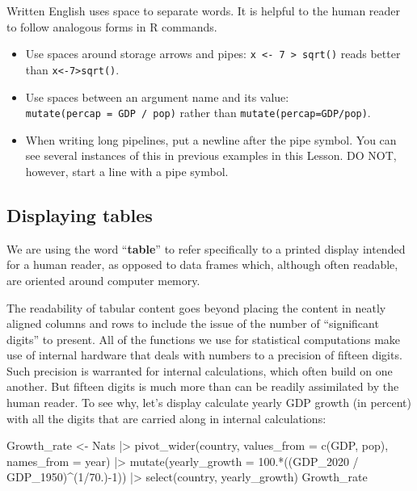 \documentclass[
  letterpaper,
  DIV=11,
  numbers=noendperiod,
  oneside]{scrartcl}
\newenvironment{Shaded}{\begin{snugshade}}{\end{snugshade}}
\newcommand{\AttributeTok}[1]{\textcolor[rgb]{0.40,0.45,0.13}{#1}}
\newcommand{\DecValTok}[1]{\textcolor[rgb]{0.68,0.00,0.00}{#1}}
\newcommand{\FloatTok}[1]{\textcolor[rgb]{0.68,0.00,0.00}{#1}}
\newcommand{\FunctionTok}[1]{\textcolor[rgb]{0.28,0.35,0.67}{#1}}
\newcommand{\NormalTok}[1]{\textcolor[rgb]{0.00,0.23,0.31}{#1}}
\newcommand{\OtherTok}[1]{\textcolor[rgb]{0.00,0.23,0.31}{#1}}
\newcommand{\SpecialCharTok}[1]{\textcolor[rgb]{0.37,0.37,0.37}{#1}}
\providecommand{\tightlist}{%
  \setlength{\itemsep}{0pt}\setlength{\parskip}{0pt}}\usepackage{longtable,booktabs,array}
\begin{document}
Written English uses space to separate words. It is helpful to the human
reader to follow analogous forms in R commands.

\begin{itemize}
\tightlist
\item
  Use spaces around storage arrows and pipes:
  \texttt{x\ \textless{}-\ 7\ \textbar{}\textgreater{}\ sqrt()} reads
  better than \texttt{x\textless{}-7\textbar{}\textgreater{}sqrt()}.
\item
  Use spaces between an argument name and its value:
  \texttt{mutate(percap\ =\ GDP\ /\ pop)} rather than
  \texttt{mutate(percap=GDP/pop)}.
\item
  When writing long pipelines, put a newline after the pipe symbol. You
  can see several instances of this in previous examples in this Lesson.
  DO NOT, however, start a line with a pipe symbol.
\end{itemize}

\subsection{Displaying tables}\label{sec-displaying-tables}

We are using the word ``\textbf{table}'' to refer specifically to a
printed display intended for a human reader, as opposed to data frames
which, although often readable, are oriented around computer memory.

The readability of tabular content goes beyond placing the content in
neatly aligned columns and rows to include the issue of the number of
``significant digits'' to present. All of the functions we use for
statistical computations make use of internal hardware that deals with
numbers to a precision of fifteen digits. Such precision is warranted
for internal calculations, which often build on one another. But fifteen
digits is much more than can be readily assimilated by the human reader.
To see why, let's display calculate yearly GDP growth (in percent) with
all the digits that are carried along in internal calculations:

\begin{Shaded}
\begin{Highlighting}[]
\NormalTok{Growth\_rate }\OtherTok{\textless{}{-}}\NormalTok{ Nats }\SpecialCharTok{|\textgreater{}} 
  \FunctionTok{pivot\_wider}\NormalTok{(country, }
              \AttributeTok{values\_from =} \FunctionTok{c}\NormalTok{(GDP, pop), }
              \AttributeTok{names\_from =}\NormalTok{ year) }\SpecialCharTok{|\textgreater{}}
  \FunctionTok{mutate}\NormalTok{(}\AttributeTok{yearly\_growth =} 
           \FloatTok{100.}\SpecialCharTok{*}\NormalTok{((GDP\_2020 }\SpecialCharTok{/}\NormalTok{ GDP\_1950)}\SpecialCharTok{\^{}}\NormalTok{(}\DecValTok{1}\SpecialCharTok{/}\FloatTok{70.}\NormalTok{)}\SpecialCharTok{{-}}\DecValTok{1}\NormalTok{)) }\SpecialCharTok{|\textgreater{}}
  \FunctionTok{select}\NormalTok{(country, yearly\_growth)}
\NormalTok{Growth\_rate}
\end{Highlighting}
\end{Shaded}
\end{document}
